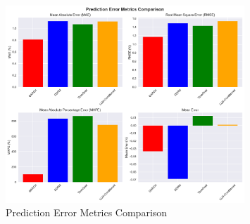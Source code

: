 \begin{figure}[htbp]
\centering
\includegraphics[width=0.8\textwidth]{figures/prediction_error_metrics.pdf}
\caption{Prediction Error Metrics Comparison}
\label{fig:predictionerrormetrics}
\end{figure}